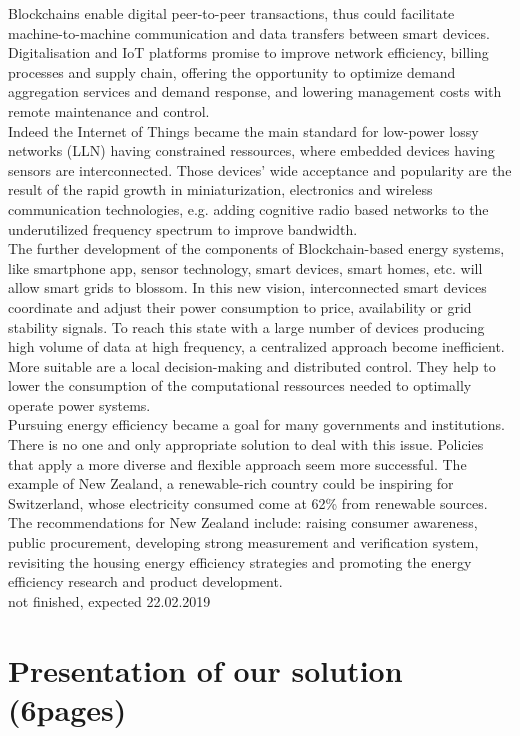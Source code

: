 \documentclass[11pt]{article}
\begin{document}
Blockchains enable digital peer-to-peer transactions, thus could facilitate machine-to-machine communication and data transfers between smart devices. Digitalisation and IoT platforms promise to improve network efficiency, billing processes and supply chain, offering the opportunity to optimize demand aggregation services and demand response, and lowering management costs with remote maintenance and control.\cite{8}\\
Indeed the Internet of Things became the main standard for low-power lossy networks (LLN) having constrained ressources, where embedded devices having sensors are interconnected. Those devices' wide acceptance and popularity are the result of the rapid growth in miniaturization, electronics and wireless communication technologies, e.g. adding cognitive radio based networks to the underutilized frequency spectrum to improve bandwidth.\cite{9}\\
The further development of the components of Blockchain-based energy systems, like smartphone app, sensor technology, smart devices, smart homes, etc. will allow smart grids to blossom. In this new vision, interconnected smart devices coordinate and adjust their power consumption to price, availability or grid stability signals. To reach this state with a large number of devices producing high volume of data at high frequency, a centralized approach become inefficient. More suitable are a local decision-making and distributed control. They help to lower the consumption of the computational ressources needed to optimally operate power systems.\cite{8}\\
Pursuing energy efficiency became a goal for many governments and institutions. There is no one and only appropriate solution to deal with this issue. Policies that apply a more diverse and flexible approach seem more successful. The example of New Zealand, a renewable-rich country could be inspiring for Switzerland, whose electricity consumed come at 62\% from renewable sources\cite{10}. The recommendations for New Zealand include: raising consumer awareness, public procurement, developing strong measurement and verification system, revisiting the housing energy efficiency strategies and promoting the energy efficiency research and product development.\cite{11}\\

not finished, expected 22.02.2019

\section{Presentation of our solution (6pages)}
\end{document}
